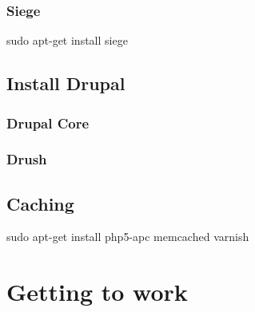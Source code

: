 \documentclass[final,ebook,10pt,twoside,openright]{memoir}
\begin{document}
\section{Siege}
\label{sec:Siege}

\begin{squashboxcommand}
sudo apt-get install siege
\end{squashboxcommand}


\chapter{Install Drupal} %
\label{cha:Install Drupal}

\section{Drupal Core}

\section{Drush}


\chapter{Caching} %
\label{cha:Caching}

\begin{squashboxcommand}
sudo apt-get install php5-apc memcached varnish
\end{squashboxcommand}


\part{Getting to work}

\end{document}
